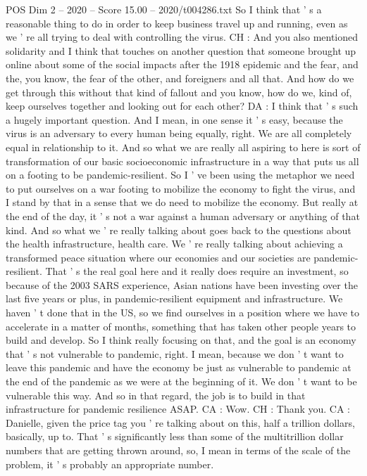 \begin{textsample}{POS Dim 2 – 2020 – Score 15.00 – 2020/t004286.txt}
So I think that ' s a reasonable thing to do in order to keep business travel up and running, even as we ' re all trying to deal with controlling the virus.
CH : And you also mentioned solidarity and I think that touches on another question that someone brought up online about some of the social impacts after the 1918 epidemic and the fear, and the, you know, the fear of the other, and foreigners and all that.
And how do we get through this without that kind of fallout and you know, how do we, kind of, keep ourselves together and looking out for each other?
DA : I think that ' s such a hugely important question.
And I mean, in one sense it ' s easy, because the virus is an adversary to every human being equally, right.
We are all completely equal in relationship to it.
And so what we are really all aspiring to here is sort of transformation of our basic socioeconomic infrastructure in a way that puts us all on a footing to be pandemic-resilient.
So I ' ve been using the metaphor we need to put ourselves on a war footing to mobilize the economy to fight the virus, and I stand by that in a sense that we do need to mobilize the economy.
But really at the end of the day, it ' s not a war against a human adversary or anything of that kind.
And so what we ' re really talking about goes back to the questions about the health infrastructure, health care.
We ' re really talking about achieving a transformed peace situation where our economies and our societies are pandemic-resilient.
That ' s the real goal here and it really does require an investment, so because of the 2003 SARS experience, Asian nations have been investing over the last five years or plus, in pandemic-resilient equipment and infrastructure.
We haven ' t done that in the US, so we find ourselves in a position where we have to accelerate in a matter of months, something that has taken other people years to build and develop.
So I think really focusing on that, and the goal is an economy that ' s not vulnerable to pandemic, right.
I mean, because we don ' t want to leave this pandemic and have the economy be just as vulnerable to pandemic at the end of the pandemic as we were at the beginning of it.
We don ' t want to be vulnerable this way.
And so in that regard, the job is to build in that infrastructure for pandemic resilience ASAP.
CA : Wow.
CH : Thank you.
CA : Danielle, given the price tag you ' re talking about on this, half a trillion dollars, basically, up to.
That ' s significantly less than some of the multitrillion dollar numbers that are getting thrown around, so, I mean in terms of the scale of the problem, it ' s probably an appropriate number.

\end{textsample}
